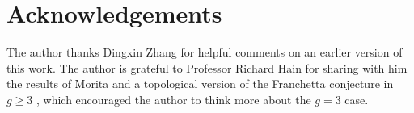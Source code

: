 \documentclass[12pt]{amsart}
\begin{document}
\section*{Acknowledgements}
The author thanks Dingxin Zhang for helpful comments on an earlier version of this work. The author is grateful to Professor Richard Hain for sharing with him the results of Morita and a topological version of the Franchetta conjecture in $g\geq3$ \cite[Theorem 24]{zbMATH01590471}, which encouraged the author to think more about the $g=3$ case.



\end{document}

